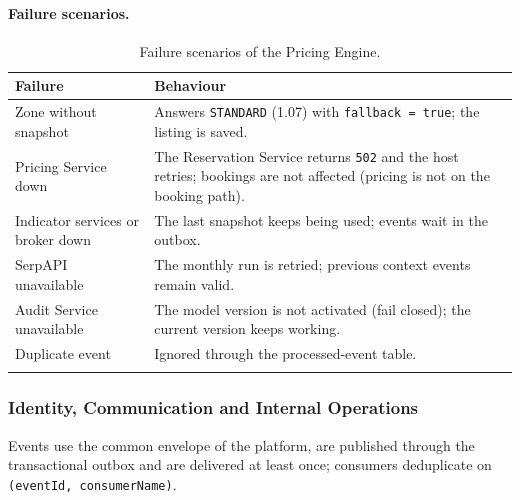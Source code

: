 \paragraph{Failure scenarios.}
\begin{longtable}{@{}L{4.6cm}L{9.2cm}@{}}
\toprule
\textbf{Failure} & \textbf{Behaviour} \\
\midrule
\endhead
Zone without snapshot & Answers \texttt{STANDARD} (1.07) with
  \texttt{fallback = true}; the listing is saved. \\
Pricing Service down & The Reservation Service returns \texttt{502} and the
  host retries; bookings are not affected (pricing is not on the booking
  path). \\
Indicator services or broker down & The last snapshot keeps being used;
  events wait in the outbox. \\
SerpAPI unavailable & The monthly run is retried; previous context events
  remain valid. \\
Audit Service unavailable & The model version is not activated (fail
  closed); the current version keeps working. \\
Duplicate event & Ignored through the processed-event table. \\
\bottomrule
\caption{Failure scenarios of the Pricing Engine.}
\label{tab:price-failures}
\end{longtable}
\endgroup

\begingroup
\setlength{\emergencystretch}{3em}
\subsubsection{Identity, Communication and Internal Operations}
\label{sec:id-async}

Events use the common envelope of the platform, are published through the
transactional outbox and are delivered at least once; consumers deduplicate on
\texttt{(event\allowbreak Id, consumer\allowbreak Name)}.

